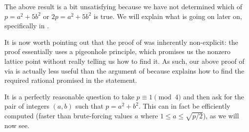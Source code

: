 \documentclass[../notes.tex]{subfiles}
\begin{document}
The above result is a bit unsatisfying because we have not determined which of $p=a^2+5b^2$ or $2p=a^2+5b^2$ is true. We will explain what is going on later on, specifically in .

It is now worth pointing out that the proof of  was inherently non-explicit: the proof essentially uses a pigeonhole principle, which promises us the nonzero lattice point without really telling us how to find it. As such, our above proof of  via  is actually less useful than the argument of  because  explains how to find the required rational promised in the statement.

It is a perfectly reasonable question to take $p\equiv1\pmod4$ and then ask for the pair of integers $(a,b)$ such that $p=a^2+b^2$. This can in fact be efficiently computed (faster than brute-forcing values $a$ where $1\le a\le\sqrt{p/2}$), as we will now see.
\end{document}
